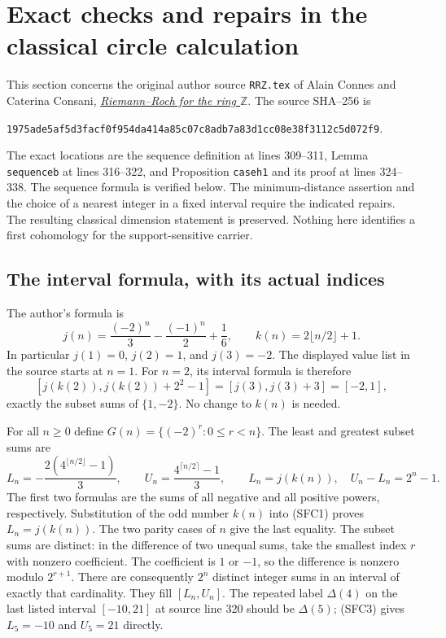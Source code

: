 \section{Exact checks and repairs in the classical circle calculation}
\label{sec:cc-circle-formula-checks}

This section concerns the original author source \texttt{RRZ.tex} of
Alain Connes and Caterina Consani,
\href{https://arxiv.org/abs/2306.00456}{\emph{Riemann--Roch for the ring
$\mathbb Z$}}. The source SHA--256 is
\par\noindent
\texttt{1975ade5af5d3facf0f954da414a85c07c8adb7a83d1cc08e38f3112c5d072f9}.
\par\noindent
The exact locations are the sequence definition at lines 309--311,
Lemma \texttt{sequenceb} at lines 316--322, and Proposition
\texttt{caseh1} and its proof at lines 324--338. The sequence formula
is verified below. The minimum-distance assertion and the choice of
a nearest integer in a fixed interval require the indicated repairs.
The resulting classical dimension statement is preserved. Nothing
here identifies a first cohomology for the support-sensitive carrier.

\subsection{The interval formula, with its actual indices}

The author's formula is
\begin{equation}\tag{SFC1}
 j(n)=\frac{(-2)^n}{3}-\frac{(-1)^n}{2}+\frac16,
 \qquad k(n)=2\lfloor n/2\rfloor+1.
\end{equation}
In particular $j(1)=0$, $j(2)=1$, and $j(3)=-2$. The displayed
value list in the source starts at $n=1$. For $n=2$, its interval
formula is therefore
\begin{equation}\tag{SFC2}
 [j(k(2)),j(k(2))+2^2-1]=[j(3),j(3)+3]=[-2,1],
\end{equation}
exactly the subset sums of $\{1,-2\}$. No change to $k(n)$ is needed.

For all $n\ge0$ define $G(n)=\{(-2)^r:0\le r<n\}$. The least
and greatest subset sums are
\begin{equation}\tag{SFC3}
 L_n=-\frac{2(4^{\lfloor n/2\rfloor}-1)}3,
 \qquad U_n=\frac{4^{\lceil n/2\rceil}-1}3,
 \qquad L_n=j(k(n)),\quad U_n-L_n=2^n-1.
\end{equation}
The first two formulas are the sums of all negative and all positive
powers, respectively. Substitution of the odd number $k(n)$ into
(SFC1) proves $L_n=j(k(n))$. The two parity cases of $n$ give the
last equality. The subset sums are distinct: in the difference of
two unequal sums, take the smallest index $r$ with nonzero coefficient.
The coefficient is $1$ or $-1$, so the difference is nonzero modulo
$2^{r+1}$. There are consequently $2^n$ distinct integer sums in an
interval of exactly that cardinality. They fill $[L_n,U_n]$.
The repeated label $\Delta(4)$ on the last listed interval
$[-10,21]$ at source line 320 should be $\Delta(5)$; (SFC3)
gives $L_5=-10$ and $U_5=21$ directly.

